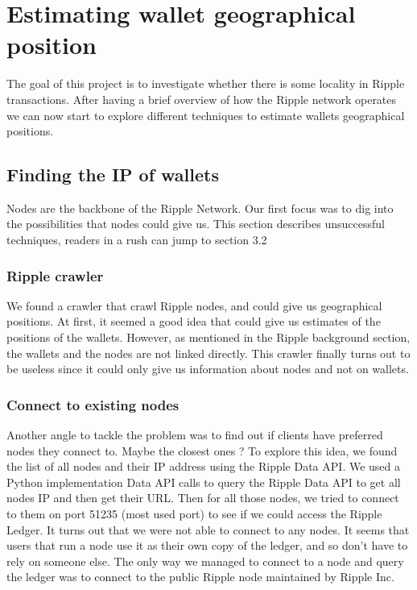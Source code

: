 \section{Estimating wallet geographical position}
The goal of this project is to investigate whether there is some locality in Ripple transactions. After having a brief overview of how the Ripple network operates we can now start to explore different techniques to estimate wallets geographical positions.

\subsection{Finding the IP of wallets}
Nodes are the backbone of the Ripple Network. Our first focus was to dig into the possibilities that nodes could give us. This section describes unsuccessful techniques, readers in a rush can jump to section 3.2

\subsubsection{Ripple crawler}
We found a crawler\cite{crawler} that crawl Ripple nodes, and could give us geographical positions. At first, it seemed a good idea that could give us estimates of the positions of the wallets. However, as mentioned in the Ripple background section, the wallets and the nodes are not linked directly. This crawler finally turns out to be useless since it could only give us information about nodes and not on wallets.

\subsubsection{Connect to existing nodes}
Another angle to tackle the problem was to find out if clients have preferred nodes they connect to. Maybe the closest ones ? To explore this idea, we found the list of all nodes and their IP address using the Ripple Data API\cite{data-api}. We used a Python implementation Data API calls to query the Ripple Data API to get all nodes IP and then get their URL. Then for all those nodes, we tried to connect to them on port 51235 (most used port) to see if we could access the Ripple Ledger. It turns out that we were not able to connect to any nodes. It seems that users that run a node use it as their own copy of the ledger, and so don't have to rely on someone else. The only way we managed to connect to a node and query the ledger was to connect to the public Ripple node maintained by Ripple Inc. 

